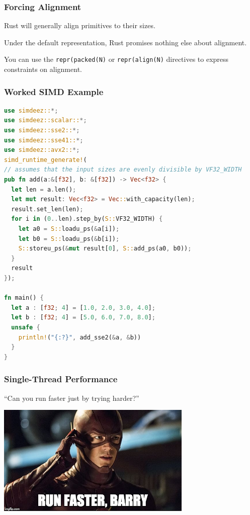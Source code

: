 \begin{frame}
\frametitle{Forcing Alignment}

Rust will generally align primitives to their sizes. 

Under the default representation, Rust promises nothing else about alignment.

You can use the \texttt{repr(packed(N)} or \texttt{repr(align(N)} directives to express constraints on alignment.


\end{frame}


\begin{frame}[fragile]
\frametitle{Worked SIMD Example}

\begin{lstlisting}[language=Rust]
use simdeez::*;
use simdeez::scalar::*;
use simdeez::sse2::*;
use simdeez::sse41::*;
use simdeez::avx2::*;
simd_runtime_generate!(
// assumes that the input sizes are evenly divisible by VF32_WIDTH
pub fn add(a:&[f32], b: &[f32]) -> Vec<f32> {
  let len = a.len();
  let mut result: Vec<f32> = Vec::with_capacity(len);
  result.set_len(len);
  for i in (0..len).step_by(S::VF32_WIDTH) {
    let a0 = S::loadu_ps(&a[i]);
    let b0 = S::loadu_ps(&b[i]);
    S::storeu_ps(&mut result[0], S::add_ps(a0, b0));
  }
  result
});

fn main() {
  let a : [f32; 4] = [1.0, 2.0, 3.0, 4.0];
  let b : [f32; 4] = [5.0, 6.0, 7.0, 8.0];
  unsafe {
    println!("{:?}", add_sse2(&a, &b))
  }
}
\end{lstlisting}



\end{frame}



\begin{frame}
\frametitle{Single-Thread Performance}

``Can you run faster just by trying harder?''

\begin{center}
\includegraphics[width=0.7\textwidth]{images/theflash.jpg}
\end{center}

\end{frame}


